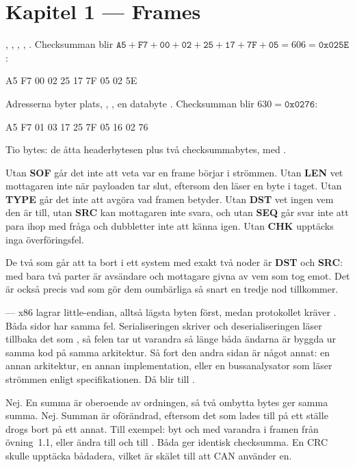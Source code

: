 \section*{Kapitel 1 --- Frames}

 , , , ,
. Checksumman blir
$\mathtt{A5}+\mathtt{F7}+\mathtt{00}+\mathtt{02}+\mathtt{25}+\mathtt{17}+\mathtt{7F}+\mathtt{05}
= 606 = \mathtt{0x025E}$:

\begin{console}
A5 F7 00 02 25 17 7F 05 02 5E
\end{console}

 Adresserna byter plats, , , en databyte .
Checksumman blir $630 = \mathtt{0x0276}$:

\begin{console}
A5 F7 01 03 17 25 7F 05 16 02 76
\end{console}

 Tio bytes: de åtta headerbytesen plus två checksummabytes, med .

Utan \textbf{SOF} går det inte att veta var en frame börjar i strömmen. Utan \textbf{LEN} vet
mottagaren inte när payloaden tar slut, eftersom den läser en byte i taget. Utan \textbf{TYPE} går
det inte att avgöra vad framen betyder. Utan \textbf{DST} vet ingen vem den är till, utan
\textbf{SRC} kan mottagaren inte svara, och utan \textbf{SEQ} går svar inte att para ihop med
fråga och dubbletter inte att känna igen. Utan \textbf{CHK} upptäcks inga överföringsfel.

De två som går att ta bort i ett system med exakt två noder är \textbf{DST} och \textbf{SRC}:
med bara två parter är avsändare och mottagare givna av vem som tog emot. Det är också precis
vad som gör dem oumbärliga så snart en tredje nod tillkommer.

  --- x86 lagrar little-endian, alltså lägsta byten först, medan protokollet
kräver .
 Båda sidor har samma fel. Serialiseringen skriver  och deserialiseringen läser
tillbaka det som , så felen tar ut varandra så länge båda ändarna är byggda ur samma
kod på samma arkitektur.
 Så fort den andra sidan är något annat: en annan arkitektur, en annan implementation, eller
en bussanalysator som läser strömmen enligt specifikationen. Då blir  till
.

 Nej. En summa är oberoende av ordningen, så två ombytta bytes ger samma summa.
 Nej. Summan är oförändrad, eftersom det som lades till på ett ställe drogs bort på ett
annat.
 Till exempel: byt  och  med varandra i framen från övning~1.1, eller
ändra  till  och  till . Båda ger identisk checksumma.
En CRC skulle upptäcka bådadera, vilket är skälet till att CAN använder en.
